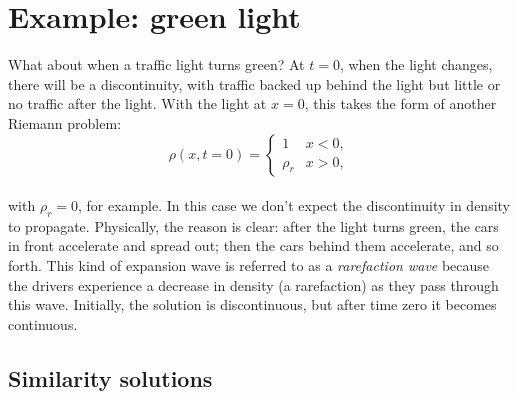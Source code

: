 \documentclass{SIAMbook2016}
\begin{document}
\hypertarget{example-green-light}{%
\section{Example: green light}\label{example-green-light}}

What about when a traffic light turns green? At \(t=0\), when the light
changes, there will be a discontinuity, with traffic backed up behind
the light but little or no traffic after the light. With the light at
\(x=0\), this takes the form of another Riemann problem:\\
\[
\rho(x,t=0) = \begin{cases} 1 & x<0, \\
                            \rho_r & x>0, \end{cases}
\]\\
with \(\rho_r = 0\), for example. In this case we don't expect the
discontinuity in density to propagate. Physically, the reason is clear:
after the light turns green, the cars in front accelerate and spread
out; then the cars behind them accelerate, and so forth. This kind of
expansion wave is referred to as a \emph{rarefaction wave} because the
drivers experience a decrease in density (a rarefaction) as they pass
through this wave. Initially, the solution is discontinuous, but after
time zero it becomes continuous.

\hypertarget{similarity-solutions}{%
\subsection{Similarity solutions}\label{similarity-solutions}}
\end{document}

